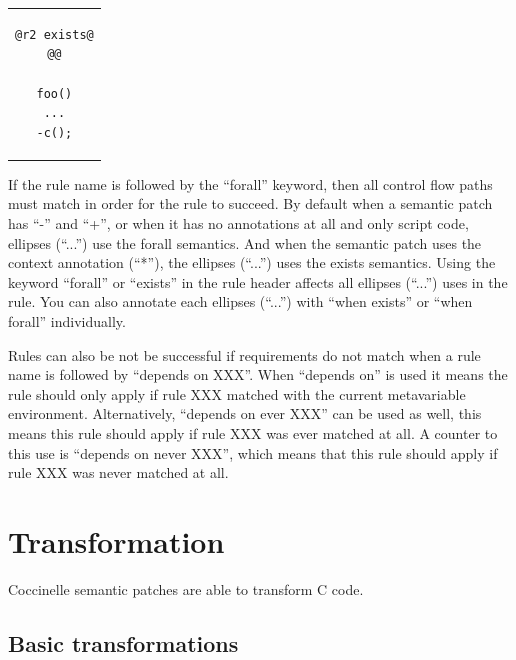\begin{center}
\begin{tabular}{c}
\begin{lstlisting}[language=Cocci]
@r2 exists@
@@

foo()
...
-c();

\end{lstlisting}\\
\end{tabular}
\end{center}

If the rule name is followed by the ``forall'' keyword, then all control flow
paths must match in order for the rule to succeed. By default when a
semantic patch has ``-'' and ``+'', or when it has no annotations at all and
only script code, ellipses (``...'') use the forall semantics.  And when the
semantic patch uses the context annotation (``*''), the ellipses (``...'') uses
the exists semantics.  Using the keyword ``forall'' or ``exists'' in the rule
header affects all ellipses (``...'') uses in the rule. You can also annotate
each ellipses (``...'') with ``when exists'' or ``when forall'' individually.

Rules can also be not be successful if requirements do not match
when a rule name is followed by ``depends on XXX''. When ``depends on'' is used
it means the rule should only apply if rule XXX matched with the current
metavariable environment. Alternatively, ``depends on ever XXX'' can be used
as well, this means this rule should apply if rule XXX was ever matched at
all. A counter to this use is ``depends on never XXX'', which means that this
rule should apply if rule XXX was never matched at all.

\section{Transformation}

Coccinelle semantic patches are able to transform C code.

\subsection{Basic transformations}

